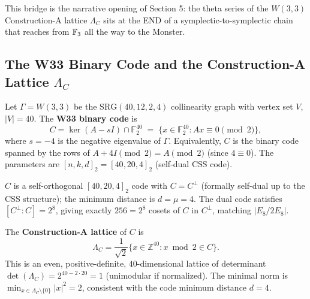 \noindent
This bridge is the narrative opening of Section 5:
the theta series of the $W(3,3)$ Construction-A lattice $\Lambda_C$
sits at the END of a symplectic-to-symplectic chain that reaches from
$\mathbb{F}_3$ all the way to the Monster.

\subsection{The W33 Binary Code and the Construction-A Lattice $\Lambda_C$}
\label{ssec:code-lattice}

\begin{definition}
Let $\Gamma = W(3,3)$ be the $\mathrm{SRG}(40,12,2,4)$ collinearity graph
with vertex set $V$, $|V| = 40$.
The \textbf{W33 binary code} is
\begin{equation}
    C = \ker(A - s I) \cap \mathbb{F}_2^{40}
    \;=\; \bigl\{ x \in \mathbb{F}_2^{40} : A x \equiv 0 \pmod{2} \bigr\},
\end{equation}
where $s = -4$ is the negative eigenvalue of $\Gamma$.
Equivalently, $C$ is the binary code spanned by the rows of
$A + 4I \pmod{2} = A \pmod{2}$ (since $4 \equiv 0$).
The parameters are $[n, k, d]_2 = [40, 20, 4]_2$ (self-dual CSS code).
\end{definition}

\begin{proposition}
\label{prop:code-params}
$C$ is a self-orthogonal $[40,20,4]_2$ code with $C = C^\perp$
(formally self-dual up to the CSS structure);
the minimum distance is $d = \mu = 4$.
The dual code satisfies $[C^\perp : C] = 2^8$, giving exactly
$256 = 2^8$ cosets of $C$ in $C^\perp$, matching $|E_8/2E_8|$.
\end{proposition}

\begin{definition}
The \textbf{Construction-A lattice} of $C$ is
\begin{equation}
    \Lambda_C = \frac{1}{\sqrt{2}} \bigl\{ x \in \mathbb{Z}^{40} : x \bmod 2 \in C \bigr\}.
\end{equation}
This is an even, positive-definite, $40$-dimensional lattice of
determinant $\det(\Lambda_C) = 2^{40-2\cdot 20} = 1$ (unimodular if
normalized).
The minimal norm is $\min_{x \in \Lambda_C \setminus \{0\}} |x|^2 = 2$,
consistent with the code minimum distance $d = 4$.
\end{definition}

